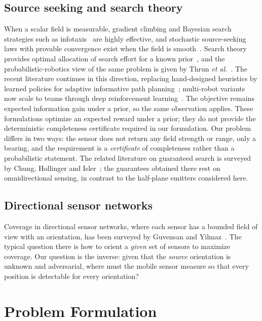\documentclass[journal,10pt]{IEEEtran}
\theoremstyle{definition}
\begin{document}
\subsection{Source seeking and search theory}
When a scalar field is measurable, gradient climbing and Bayesian search strategies such as
infotaxis~\cite{vergassola2007} are highly effective, and stochastic source-seeking laws with
provable convergence exist when the field is smooth~\cite{azuma2012}. Search theory provides
optimal allocation of search effort for a known prior~\cite{stone2007,koopman1980}, and the
probabilistic-robotics view of the same problem is given by
Thrun \emph{et al.}~\cite{thrun2005}. The recent literature continues in this direction,
replacing hand-designed heuristics by learned policies for adaptive informative path
planning~\cite{popovic2024}; multi-robot variants now scale to teams through deep reinforcement
learning~\cite{vashisth2026}. The objective remains expected information gain under a prior, so
the same observation applies. These formulations optimize an expected reward under a
prior; they do not provide the deterministic completeness certificate required in our
formulation. Our problem differs in two ways:
the sensor does not return any field strength or range, only a bearing, and the requirement is a
\emph{certificate} of completeness rather than a probabilistic statement. The related literature on guaranteed search is surveyed by Chung, Hollinger and
Isler~\cite{chung2011}; the guarantees obtained there rest on omnidirectional sensing, in contrast
to the half-plane emitters considered here.

\subsection{Directional sensor networks}
Coverage in directional sensor networks, where each sensor has a bounded field of view with an
orientation, has been surveyed by Guvensan and Yilmaz~\cite{guvensan2011}. The typical question
there is how to orient a \emph{given} set of sensors to maximize coverage. Our question is the
inverse: given that the \emph{source} orientation is unknown and adversarial, where must the
mobile sensor measure so that every position is detectable for every orientation?

\section{Problem Formulation}
\label{sec:problem}
\end{document}
